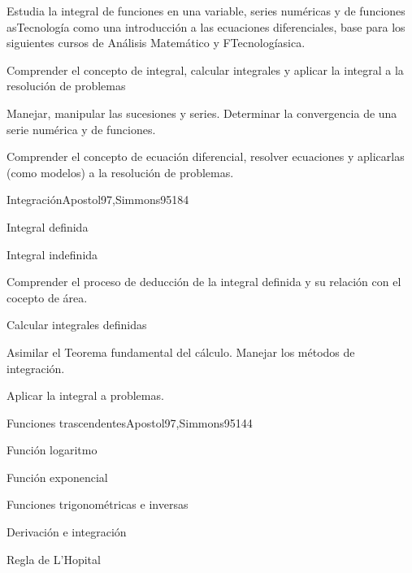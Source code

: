 \begin{syllabus}


\begin{justification}
Estudia la integral de funciones en una variable, series numéricas y de funciones asTecnología como una introducción a las ecuaciones diferenciales, base para los siguientes cursos de Análisis Matemático y FTecnologíasica.
\end{justification}

\begin{goals}
\item Comprender el concepto de integral, calcular integrales y aplicar la integral a la resolución de problemas
\item Manejar, manipular las sucesiones y series. Determinar la convergencia de una serie numérica y de funciones.
\item Comprender el concepto de ecuación diferencial, resolver ecuaciones y aplicarlas (como modelos) a la resolución de problemas.
\end{goals}

\begin{outcomes}
\end{outcomes}

\begin{unit}{Integración}{Apostol97,Simmons95}{18}{4}
   \begin{topics}
      \item Integral definida
      \item Integral indefinida
   \end{topics}

   \begin{unitgoals}
      \item Comprender el proceso de deducción de la integral definida y su relación con el cocepto de área.
      \item Calcular integrales definidas
      \item Asimilar el Teorema fundamental del cálculo. Manejar los métodos de integración.
      \item Aplicar la integral a problemas.
   \end{unitgoals}
\end{unit}

\begin{unit}{Funciones trascendentes}{Apostol97,Simmons95}{14}{4}
   \begin{topics}
      \item Función logaritmo
      \item Función exponencial
      \item Funciones trigonométricas e inversas
      \item Derivación e integración
      \item Regla de L'Hopital
   \end{topics}


\end{unit}
\end{syllabus}
